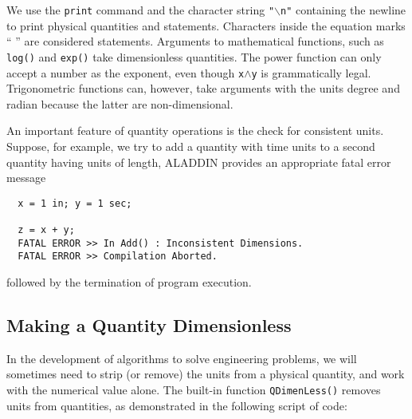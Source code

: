 \vspace{0.15 in}\noindent
We use the {\tt print} command and the character string {\tt "$\backslash$n"}
containing the newline to
print physical quantities and statements.
Characters inside the equation marks ``  '' are considered statements.
Arguments to mathematical functions,
such as {\tt log()} and {\tt exp()} take dimensionless quantities.
The power function can only accept a number as the exponent,
even though {\tt x$\wedge$y} is grammatically legal. 
Trigonometric functions can, however, take arguments
with the units degree and radian because the latter are non-dimensional.

\vspace{0.15 in}
\noindent\hspace{0.5 in}
An important feature of quantity operations is the check for consistent units.
Suppose, for example, we try to add a quantity with time units
to a second quantity having units of length,
ALADDIN provides an appropriate fatal error message

\begin{footnotesize}
\begin{verbatim}
  x = 1 in; y = 1 sec;

  z = x + y;
  FATAL ERROR >> In Add() : Inconsistent Dimensions.
  FATAL ERROR >> Compilation Aborted.
\end{verbatim}
\end{footnotesize}

\vspace{0.15 in}\noindent
followed by the termination of program execution.

\subsection{Making a Quantity Dimensionless}

\vspace{0.15 in}
\noindent\hspace{0.5 in}
In the development of algorithms to solve engineering problems,
we will sometimes need to strip (or remove) the units
from a physical quantity, and work with the numerical value alone.
The built-in function {\tt QDimenLess()} removes units from quantities,
as demonstrated in the following script of code:

